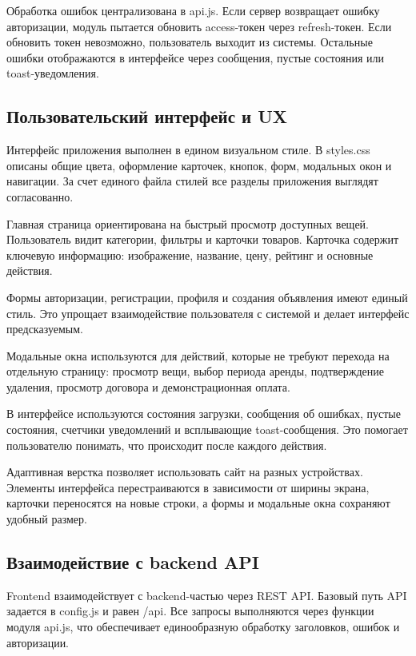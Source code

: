 Обработка ошибок централизована в api.js. Если сервер возвращает ошибку авторизации, модуль пытается обновить access-токен через refresh-токен. Если обновить токен невозможно, пользователь выходит из системы. Остальные ошибки отображаются в интерфейсе через сообщения, пустые состояния или toast-уведомления.

\subsection{Пользовательский интерфейс и UX}

Интерфейс приложения выполнен в едином визуальном стиле. В styles.css описаны общие цвета, оформление карточек, кнопок, форм, модальных окон и навигации. За счет единого файла стилей все разделы приложения выглядят согласованно.

Главная страница ориентирована на быстрый просмотр доступных вещей. Пользователь видит категории, фильтры и карточки товаров. Карточка содержит ключевую информацию: изображение, название, цену, рейтинг и основные действия.

Формы авторизации, регистрации, профиля и создания объявления имеют единый стиль. Это упрощает взаимодействие пользователя с системой и делает интерфейс предсказуемым.

Модальные окна используются для действий, которые не требуют перехода на отдельную страницу: просмотр вещи, выбор периода аренды, подтверждение удаления, просмотр договора и демонстрационная оплата.

В интерфейсе используются состояния загрузки, сообщения об ошибках, пустые состояния, счетчики уведомлений и всплывающие toast-сообщения. Это помогает пользователю понимать, что происходит после каждого действия.

Адаптивная верстка позволяет использовать сайт на разных устройствах. Элементы интерфейса перестраиваются в зависимости от ширины экрана, карточки переносятся на новые строки, а формы и модальные окна сохраняют удобный размер.

\subsection{Взаимодействие с backend API}

Frontend взаимодействует с backend-частью через REST API. Базовый путь API задается в config.js и равен /api. Все запросы выполняются через функции модуля api.js, что обеспечивает единообразную обработку заголовков, ошибок и авторизации.


